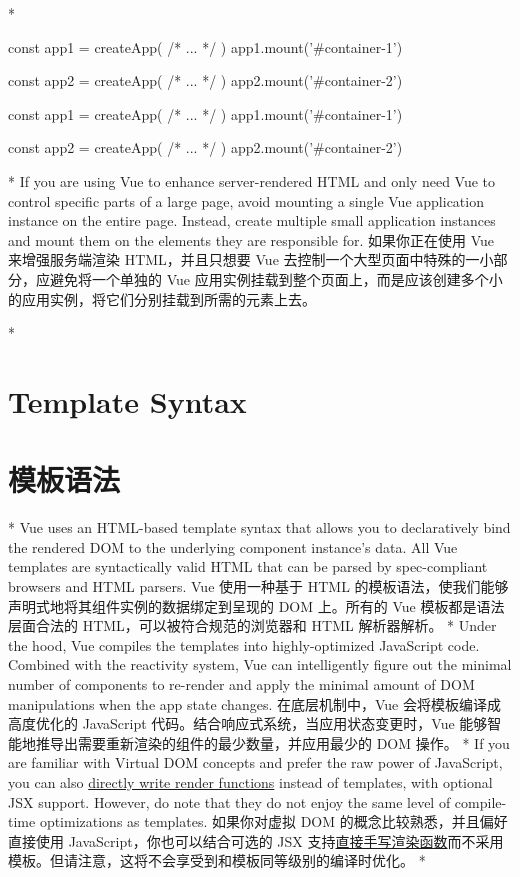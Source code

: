 \begin{paracol}{2}
\switchcolumn[0]*%
\begin{codeJs}
const app1 = createApp({
    /* ... */
})
app1.mount('#container-1')

const app2 = createApp({
    /* ... */
})
app2.mount('#container-2')
\end{codeJs}
\switchcolumn
\begin{codeJs}
const app1 = createApp({
    /* ... */
})
app1.mount('#container-1')

const app2 = createApp({
    /* ... */
})
app2.mount('#container-2')
\end{codeJs}

\switchcolumn[0]*%
If you are using Vue to enhance server-rendered HTML and only need Vue
to control specific parts of a large page, avoid mounting a single Vue
application instance on the entire page. Instead, create multiple small
application instances and mount them on the elements they are
responsible for.
\switchcolumn
如果你正在使用 Vue 来增强服务端渲染 HTML，并且只想要 Vue
去控制一个大型页面中特殊的一小部分，应避免将一个单独的 Vue
应用实例挂载到整个页面上，而是应该创建多个小的应用实例，将它们分别挂载到所需的元素上去。

\switchcolumn[0]*%
\section{Template Syntax}
\switchcolumn
\section{模板语法}
\switchcolumn[0]*%
Vue uses an HTML-based template syntax that allows you to declaratively
bind the rendered DOM to the underlying component instance's data. All
Vue templates are syntactically valid HTML that can be parsed by
spec-compliant browsers and HTML parsers.
\switchcolumn
Vue 使用一种基于 HTML
的模板语法，使我们能够声明式地将其组件实例的数据绑定到呈现的 DOM
上。所有的 Vue 模板都是语法层面合法的 HTML，可以被符合规范的浏览器和
HTML 解析器解析。
\switchcolumn[0]*%
Under the hood, Vue compiles the templates into highly-optimized
JavaScript code. Combined with the reactivity system, Vue can
intelligently figure out the minimal number of components to re-render
and apply the minimal amount of DOM manipulations when the app state
changes.
\switchcolumn
在底层机制中，Vue 会将模板编译成高度优化的 JavaScript
代码。结合响应式系统，当应用状态变更时，Vue
能够智能地推导出需要重新渲染的组件的最少数量，并应用最少的 DOM 操作。
\switchcolumn[0]*%
If you are familiar with Virtual DOM concepts and prefer the raw power
of JavaScript, you can also
\href{https://vuejs.org/guide/extras/render-function.html}{directly
write render functions} instead of templates, with optional JSX support.
However, do note that they do not enjoy the same level of compile-time
optimizations as templates.
\switchcolumn
如果你对虚拟 DOM 的概念比较熟悉，并且偏好直接使用
JavaScript，你也可以结合可选的 JSX
支持\href{https://cn.vuejs.org/guide/extras/render-function.html}{直接手写渲染函数}而不采用模板。但请注意，这将不会享受到和模板同等级别的编译时优化。
\switchcolumn[0]*%

\end{paracol}

